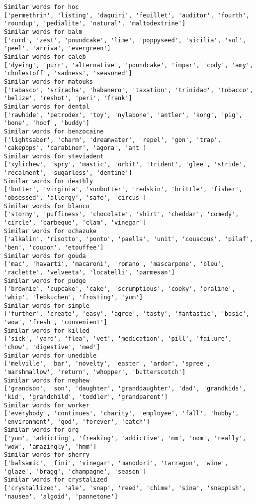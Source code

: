 \documentclass[11pt]{article}
\begin{document}
\begin{Verbatim}[commandchars=\\\{\}]
Similar words for hoc
['permethrin', 'listing', 'daquiri', 'feuillet', 'auditor', 'fourth', 'roundup', 'pedialite', 'natural', 'maltodextrine']
Similar words for balm
['curd', 'zest', 'poundcake', 'lime', 'poppyseed', 'sicilia', 'sol', 'peel', 'arriva', 'evergreen']
Similar words for caleb
['dyeing', 'purr', 'alternative', 'poundcake', 'impar', 'cody', 'amy', 'cholestoff', 'sadness', 'seasoned']
Similar words for matouks
['tabasco', 'sriracha', 'habanero', 'taxation', 'trinidad', 'tobacco', 'belize', 'reshot', 'peri', 'frank']
Similar words for dental
['rawhide', 'petrodex', 'toy', 'nylabone', 'antler', 'kong', 'pig', 'bone', 'hoof', 'buddy']
Similar words for benzocaine
['lightsaber', 'charm', 'dreamwater', 'repel', 'gon', 'trap', 'cakepops', 'carabiner', 'agora', 'ant']
Similar words for steviadent
['xylichew', 'spry', 'mastic', 'orbit', 'trident', 'glee', 'stride', 'recalment', 'sugarless', 'dentine']
Similar words for deathly
['butter', 'virginia', 'sunbutter', 'redskin', 'brittle', 'fisher', 'obsessed', 'allergy', 'safe', 'circus']
Similar words for blanco
['stormy', 'puffiness', 'chocolate', 'shirt', 'cheddar', 'comedy', 'circle', 'barbeque', 'clam', 'vinegar']
Similar words for ochazuke
['alkalin', 'risotto', 'ponto', 'paella', 'unit', 'couscous', 'pilaf', 'ben', 'coupon', 'etouffee']
Similar words for gouda
['mac', 'havarti', 'macaroni', 'romano', 'mascarpone', 'bleu', 'raclette', 'velveeta', 'locatelli', 'parmesan']
Similar words for pudge
['brownie', 'cupcake', 'cake', 'scrumptious', 'cooky', 'praline', 'whip', 'lebkuchen', 'frosting', 'yum']
Similar words for simple
['further', 'create', 'easy', 'agree', 'tasty', 'fantastic', 'basic', 'wow', 'fresh', 'convenient']
Similar words for killed
['sick', 'yard', 'flea', 'vet', 'medication', 'pill', 'failure', 'chow', 'digestive', 'med']
Similar words for unedible
['melville', 'bar', 'novelty', 'easter', 'ardor', 'spree', 'marshmallow', 'return', 'whopper', 'butterscotch']
Similar words for nephew
['grandson', 'son', 'daughter', 'granddaughter', 'dad', 'grandkids', 'kid', 'grandchild', 'toddler', 'grandparent']
Similar words for worker
['everybody', 'continues', 'charity', 'employee', 'fall', 'hubby', 'environment', 'god', 'forever', 'catch']
Similar words for org
['yum', 'addicting', 'freaking', 'addictive', 'mm', 'nom', 'really', 'wow', 'amazingly', 'hmm']
Similar words for sherry
['balsamic', 'fini', 'vinegar', 'manodori', 'tarragon', 'wine', 'glaze', 'bragg', 'champagne', 'season']
Similar words for crystalized
['crystallized', 'ale', 'snap', 'reed', 'chime', 'sina', 'snappish', 'nausea', 'algoid', 'pannetone']

\end{Verbatim}
\end{document}
